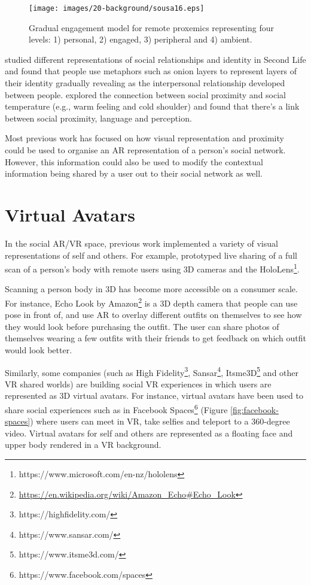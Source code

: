 \begin{figure}
    \centering
    \texttt{[image: images/20-background/sousa16.eps]}
    \caption{Gradual engagement model for remote proxemics representing four levels: 1) personal, 2) engaged, 3) peripheral and 4) ambient. \cite{Sousa2016}}
    \label{fig:Sousa2016}
\end{figure}

\textcite{Leshed2012} studied different representations of social relationships and identity in Second Life and found that people use metaphors such as onion layers to represent layers of their identity gradually revealing as the interpersonal relationship developed between people. \textcite{Hans2009} explored the connection between social proximity and social temperature (e.g., warm feeling and cold shoulder) and found that there's a link between social proximity, language and perception. 


Most previous work has focused on how visual representation and proximity could be used to organise an AR representation of a person's social network. However, this information could also be used to modify the contextual information being shared by a user out to their social network as well. 

\section{Virtual Avatars}

In the social AR/VR space, previous work implemented a variety of visual representations of self and others. For example, \textcite{Fanello2016} prototyped live sharing of a full scan of a person's body with remote users using 3D cameras and the HoloLens\footnote{https://www.microsoft.com/en-nz/hololens}. 

Scanning a person body in 3D has become more accessible on a consumer scale. For instance, Echo Look by Amazon\footnote{\url{https://en.wikipedia.org/wiki/Amazon\_Echo\#Echo\_Look}} is a 3D depth camera that people can use pose in front of, and use AR to overlay different outfits on themselves to see how they would look before purchasing the outfit. The user can share photos of themselves wearing a few outfits with their friends to get feedback on which outfit would look better. 

Similarly, some companies (such as High Fidelity\footnote{https://highfidelity.com/}, Sansar\footnote{https://www.sansar.com/}, Itsme3D\footnote{https://www.itsme3d.com/} and other VR shared worlds) are building social VR experiences in which users are represented as 3D virtual avatars. For instance, virtual avatars have been used to share social experiences such as in Facebook Spaces\footnote{https://www.facebook.com/spaces} (Figure \ref{fig:facebook-spaces}) where users can meet in VR, take selfies and teleport to a 360-degree video. Virtual avatars for self and others are represented as a floating face and upper body rendered in a VR background. 

